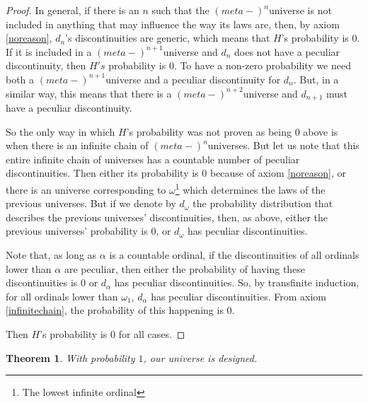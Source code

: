 \documentclass[a4paper
,draft
]{article}
\def\infordinala{\omega}
\def\infordinalb{\omega_1}
\newtheorem{theorem}{Theorem}[section]
\begin{document}
\begin{proof}
In general, if there is an $n$ such that the $(meta-)^{n}$universe is not included in anything that may influence the way its laws are, then, by axiom \ref{noreason}, $d_n$'s discontinuities are generic, which means that $H$'s probability is $0$. If it is included in a $(meta-)^{n+1}$universe and $d_n$ does not have a peculiar discontinuity, then $H's$ probability is $0$. To have a non-zero probability we need both a $(meta-)^{n+1}$universe and a peculiar discontinuity for $d_n$. But, in a similar way, this means that there is a $(meta-)^{n+2}$universe and $d_{n+1}$ must have a peculiar discontinuity.

So the only way in which $H$'s probability was not proven as being $0$ above is when there is an infinite chain of $(meta-)^{n}$universes. But let us note that this entire infinite chain of universes has a countable number of peculiar discontinuities. Then either its probability is $0$ because of axiom \ref{noreason}, or there is an universe corresponding to $\infordinala$\footnote{The lowest infinite ordinal} which determines the laws of the previous universes. But if we denote by $d_{\infordinala}$ the probability distribution that describes the previous universes' discontinuities, then, as above, either the previous universes' probability is 0, or $d_{\infordinala}$ has peculiar discontinuities.

Note that, as long as $\alpha$ is a countable ordinal, if the discontinuities of all ordinals lower than $\alpha$ are peculiar, then either the probability of having these discontinuities is $0$ or $d_\alpha$ has peculiar discontinuities. So, by transfinite induction, for all ordinals lower than $\infordinalb$, $d_\alpha$ has peculiar discontinuities. From axiom \ref{infinitechain}, the probability of this happening is $0$.

Then $H$'s probability is $0$ for all cases.
\end{proof}

\begin{theorem}
With probability $1$, our universe is designed.
\end{theorem}
\end{document}
